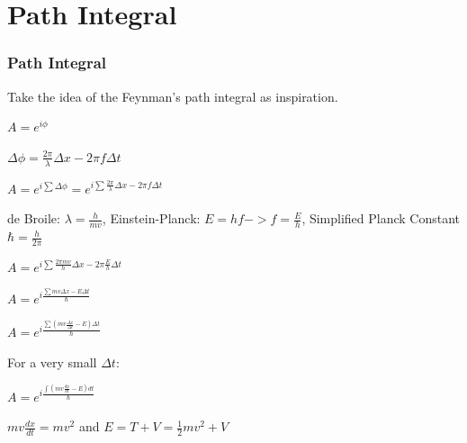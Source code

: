 \documentclass{beamer}
\begin{document}
\section{Path Integral}
\begin{frame}
\frametitle{Path Integral}

Take the idea of the Feynman's path integral as inspiration.

$A = e^{i \phi}$

$\Delta \phi = \frac{2 \pi}{\lambda}\Delta x - 2\pi f \Delta t$

$A = e^{i \sum \Delta \phi} = e^{i \sum \frac{2 \pi}{\lambda}\Delta x -2 \pi f \Delta t}$

de Broile: $\lambda = \frac{h}{mv}$, Einstein-Planck: $E = hf -> f = \frac{E}{h}$, Simplified Planck Constant $\hbar = \frac{h}{2\pi}$

$A = e^{i \sum \frac{2\pi mv}{h} \Delta x -2\pi \frac{E}{h} \Delta t}$

$A = e^{i \frac{\sum mv \Delta x - E \Delta t}{\hbar}}$

$A = e^{i \frac{\sum \left( mv \frac{\Delta x}{\Delta t} - E\right) \Delta t}{\hbar}}$

For a very small $\Delta t$:

$A = e^{i \frac{\int \left( mv \frac{d x}{d t} - E\right) d t}{\hbar}}$

$mv \frac{d x}{d t} = mv^{2}$ and $E = T + V = \frac{1}{2} mv^{2} + V$


\end{frame}

\end{document}
